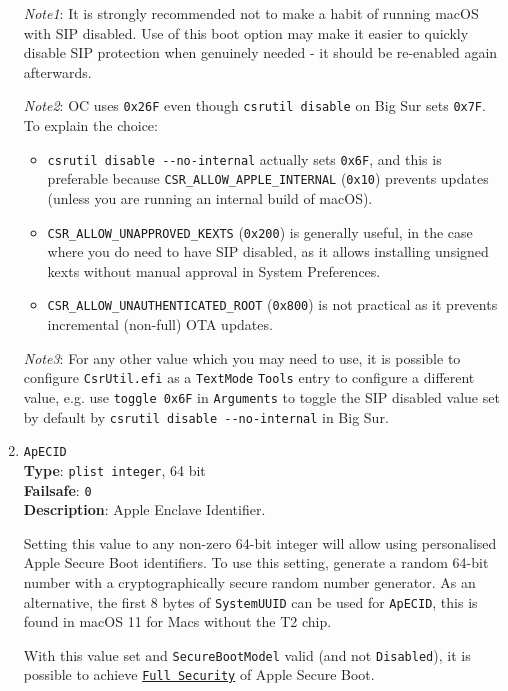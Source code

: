 \documentclass[]{article}
\providecommand{\tightlist}{%
  \setlength{\itemsep}{0pt}\setlength{\parskip}{0pt}}
\begin{document}
\begin{enumerate}
  \emph{Note1}: It is strongly recommended not to make a habit of running macOS with
  SIP disabled. Use of this boot option may make it easier to quickly disable SIP
  protection when genuinely needed - it should be re-enabled again afterwards.

  \emph{Note2}: OC uses \texttt{0x26F} even though \texttt{csrutil disable} on Big Sur
  sets \texttt{0x7F}. To explain the choice:
  \begin{itemize}
  \tightlist
  \item \texttt{csrutil disable -{}-no-internal} actually sets \texttt{0x6F}, and this is
  preferable because \texttt{CSR\_ALLOW\_APPLE\_INTERNAL} (\texttt{0x10}) prevents updates
  (unless you are running an internal build of macOS).
  \item \texttt{CSR\_ALLOW\_UNAPPROVED\_KEXTS} (\texttt{0x200}) is generally useful, in the case
  where you do need to have SIP disabled, as it allows installing unsigned kexts without manual
  approval in System Preferences.
  \item \texttt{CSR\_ALLOW\_UNAUTHENTICATED\_ROOT} (\texttt{0x800}) is not practical as it prevents
  incremental (non-full) OTA updates.
  \end{itemize}
 
  \emph{Note3}: For any other value which you may need to use, it is possible to
  configure \texttt{CsrUtil.efi} as a \texttt{TextMode} \texttt{Tools} entry to configure a
  different value, e.g. use \texttt{toggle\ 0x6F} in \texttt{Arguments} to toggle the
  SIP disabled value set by default by \texttt{csrutil disable -{}-no-internal} in Big Sur.

\item
  \texttt{ApECID}\\
  \textbf{Type}: \texttt{plist\ integer}, 64 bit\\
  \textbf{Failsafe}: \texttt{0}\\
  \textbf{Description}: Apple Enclave Identifier.

  Setting this value to any non-zero 64-bit integer will allow using
  personalised Apple Secure Boot identifiers. To use this setting,
  generate a random 64-bit number with a cryptographically secure
  random number generator. As an alternative, the first 8 bytes of \texttt{SystemUUID}
  can be used for \texttt{ApECID}, this is found in macOS 11 for Macs without
  the T2 chip.

  With this value set and \texttt{SecureBootModel} valid
  (and not \texttt{Disabled}), it is possible to achieve
  \href{https://support.apple.com/en-us/HT208330}{\texttt{Full Security}} of Apple
  Secure Boot.


\end{enumerate}
\end{document}
